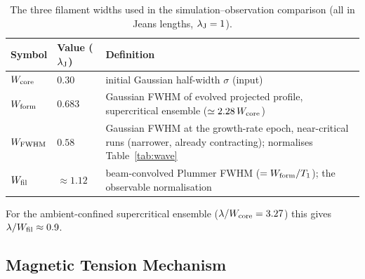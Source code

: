 \documentclass[usenatbib,twoside,twocolumn]{mnras}
\begin{document}
\begin{table}
\caption{The three filament widths used in the simulation--observation comparison (all in Jeans lengths, $\lambda_{\rm J}=1$).}
\label{tab:widthdefs}
\footnotesize
\setlength{\tabcolsep}{3pt}
\begin{tabular}{p{1.5cm}p{1.4cm}p{4.0cm}}
\toprule
Symbol & Value ($\lambda_{\rm J}$) & Definition \\
\midrule
$W_{\rm core}$ & $0.30$ & initial Gaussian half-width $\sigma$ (input) \\
$W_{\rm form}$ & $0.683$ & Gaussian FWHM of evolved projected profile, supercritical ensemble ($\simeq2.28\,W_{\rm core}$) \\
$W_{\rm FWHM}$ & $0.58$ & Gaussian FWHM at the growth-rate epoch, near-critical runs (narrower, already contracting); normalises Table~\ref{tab:wave} \\
$W_{\rm fil}$ & $\approx1.12$ & beam-convolved Plummer FWHM ($=W_{\rm form}/T_1$); the observable normalisation \\
\bottomrule
\end{tabular}
\end{table}

For the ambient-confined supercritical ensemble ($\lambda/W_{\rm core}=3.27$) this gives $\lambda/W_{\rm fil}\approx0.9$.

\subsection{Magnetic Tension Mechanism}
\label{sec:magnetic}
\end{document}
